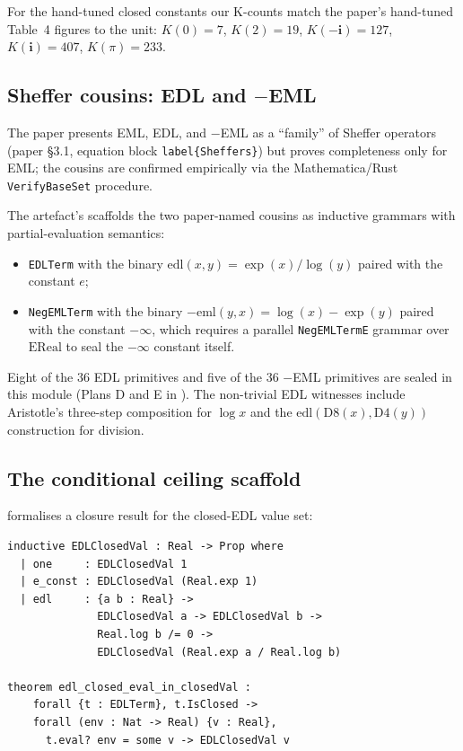 \documentclass[11pt,a4paper]{article}
\theoremstyle{plain}
\theoremstyle{definition}
\newcommand{\eml}{\mathrm{eml}}
\newcommand{\edl}{\mathrm{edl}}
\newcommand{\imu}{\mathbf{i}}
\begin{document}
For the hand-tuned closed constants our K-counts match the paper's
hand-tuned Table~4 figures to the unit: $K(0) = 7$, $K(2) = 19$,
$K(-\imu) = 127$, $K(\imu) = 407$, $K(\pi) = 233$.

\subsection{\texorpdfstring{Sheffer cousins: EDL and $-$EML}{Sheffer cousins: EDL and -EML}}\label{sec:sheffer}

The paper presents EML, EDL, and $-$EML as a ``family'' of Sheffer
operators (paper §3.1, equation block \texttt{label\{Sheffers\}}) but
proves completeness only for EML; the cousins are confirmed
empirically via the Mathematica/Rust \texttt{VerifyBaseSet} procedure.

The artefact's  scaffolds the two
paper-named cousins as inductive grammars with partial-evaluation
semantics:

\begin{itemize}[topsep=2pt, itemsep=2pt]
  \item \texttt{EDLTerm} with the binary
    $\edl(x, y) = \exp(x) / \log(y)$ paired with the constant $e$;
  \item \texttt{NegEMLTerm} with the binary
    $-\eml(y, x) = \log(x) - \exp(y)$ paired with the constant
    $-\infty$, which requires a parallel \texttt{NegEMLTermE} grammar
    over $\mathrm{EReal}$ to seal the $-\infty$ constant itself.
\end{itemize}

Eight of the $36$ EDL primitives and five of the $36$ $-$EML
primitives are sealed in this module (Plans D and E in
). The non-trivial EDL witnesses include
Aristotle's three-step composition for $\log x$ and the
$\edl(\mathrm{D8}(x), \mathrm{D4}(y))$ construction for division.

\subsection{The conditional ceiling scaffold}\label{sec:ceiling}

 formalises a closure result for
the closed-EDL value set:

\begin{lstlisting}[language=Lean]
inductive EDLClosedVal : Real -> Prop where
  | one     : EDLClosedVal 1
  | e_const : EDLClosedVal (Real.exp 1)
  | edl     : {a b : Real} ->
              EDLClosedVal a -> EDLClosedVal b ->
              Real.log b /= 0 ->
              EDLClosedVal (Real.exp a / Real.log b)

theorem edl_closed_eval_in_closedVal :
    forall {t : EDLTerm}, t.IsClosed ->
    forall (env : Nat -> Real) {v : Real},
      t.eval? env = some v -> EDLClosedVal v
\end{lstlisting}
\end{document}
